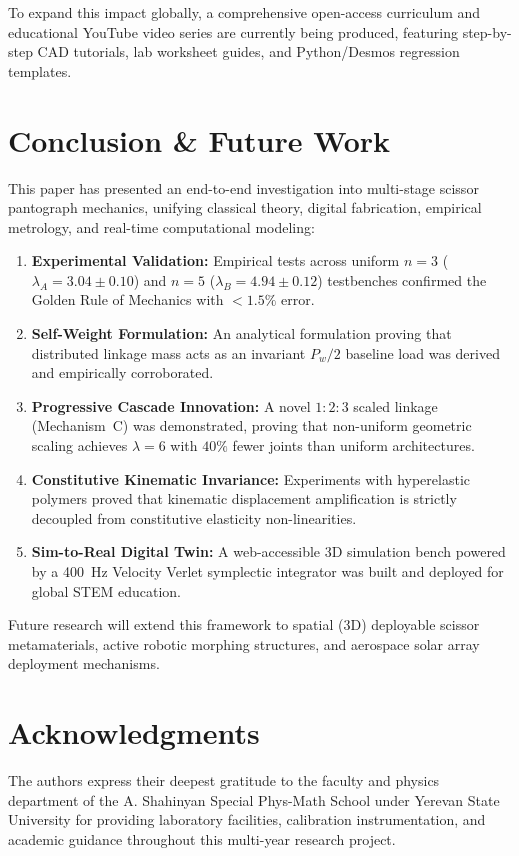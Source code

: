 \documentclass[10pt,twocolumn]{article}
\begin{document}
To expand this impact globally, a comprehensive open-access curriculum and educational YouTube video series are currently being produced, featuring step-by-step CAD tutorials, lab worksheet guides, and Python/Desmos regression templates.

\section{Conclusion \& Future Work}

This paper has presented an end-to-end investigation into multi-stage scissor pantograph mechanics, unifying classical theory, digital fabrication, empirical metrology, and real-time computational modeling:
\begin{enumerate}
    \item \textbf{Experimental Validation:} Empirical tests across uniform $n=3$ ($\lambda_A = 3.04 \pm 0.10$) and $n=5$ ($\lambda_B = 4.94 \pm 0.12$) testbenches confirmed the Golden Rule of Mechanics with $<1.5\%$ error.
    \item \textbf{Self-Weight Formulation:} An analytical formulation proving that distributed linkage mass acts as an invariant $P_w/2$ baseline load was derived and empirically corroborated.
    \item \textbf{Progressive Cascade Innovation:} A novel $1:2:3$ scaled linkage (Mechanism~C) was demonstrated, proving that non-uniform geometric scaling achieves $\lambda = 6$ with $40\%$ fewer joints than uniform architectures.
    \item \textbf{Constitutive Kinematic Invariance:} Experiments with hyperelastic polymers proved that kinematic displacement amplification is strictly decoupled from constitutive elasticity non-linearities.
    \item \textbf{Sim-to-Real Digital Twin:} A web-accessible 3D simulation bench powered by a 400~Hz Velocity Verlet symplectic integrator was built and deployed for global STEM education.
\end{enumerate}

Future research will extend this framework to spatial (3D) deployable scissor metamaterials, active robotic morphing structures, and aerospace solar array deployment mechanisms.

\section*{Acknowledgments}

The authors express their deepest gratitude to the faculty and physics department of the A. Shahinyan Special Phys-Math School under Yerevan State University for providing laboratory facilities, calibration instrumentation, and academic guidance throughout this multi-year research project.



\end{document}

